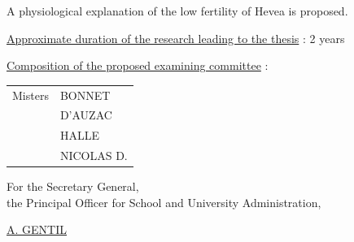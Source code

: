 A physiological explanation of the low fertility of Hevea is proposed.

\uline{Approximate duration of the research leading to the thesis} : 2 years

\uline{Composition of the proposed examining committee} : \begin{tabular}[t]{ll}
Misters & BONNET\\
& D'AUZAC\\
& HALLE\\
& NICOLAS D.
\end{tabular}

\begin{flushright}
For the Secretary General,\\
the Principal Officer for School and University Administration,


\uline{A. GENTIL}
\end{flushright}

